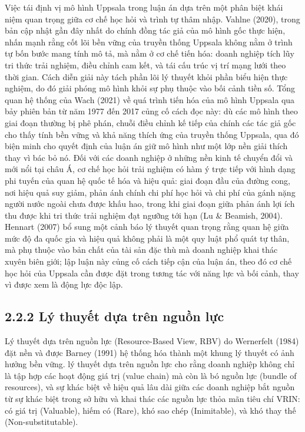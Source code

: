 \documentclass[
  a4paper,
  13pt]{extreport}
\begin{document}
Việc tái định vị mô hình Uppsala trong luận án dựa trên một phân biệt
khái niệm quan trọng giữa cơ chế học hỏi và trình tự thâm nhập. Vahlne
(2020), trong bản cập nhật gần đây nhất do chính đồng tác giả của mô
hình gốc thực hiện, nhấn mạnh rằng cốt lõi bền vững của truyền thống
Uppsala không nằm ở trình tự bốn bước mang tính mô tả, mà nằm ở cơ chế
tiến hóa: doanh nghiệp tích lũy tri thức trải nghiệm, điều chỉnh cam
kết, và tái cấu trúc vị trí mạng lưới theo thời gian. Cách diễn giải này
tách phần lõi lý thuyết khỏi phần biểu hiện thực nghiệm, do đó giải
phóng mô hình khỏi sự phụ thuộc vào bối cảnh tiền số. Tổng quan hệ thống
của Wach (2021) về quá trình tiến hóa của mô hình Uppsala qua bảy phiên
bản từ năm 1977 đến 2017 củng cố cách đọc này: dù các mô hình theo giai
đoạn thường bị phê phán, chuỗi điều chỉnh kế tiếp của chính các tác giả
gốc cho thấy tính bền vững và khả năng thích ứng của truyền thống
Uppsala, qua đó biện minh cho quyết định của luận án giữ mô hình như một
lớp nền giải thích thay vì bác bỏ nó. Đối với các doanh nghiệp ở những
nền kinh tế chuyển đổi và mới nổi tại châu Á, cơ chế học hỏi trải nghiệm
có hàm ý trực tiếp với hình dạng phi tuyến của quan hệ quốc tế hóa và
hiệu quả: giai đoạn đầu của đường cong, nơi hiệu quả suy giảm, phản ánh
chính chi phí học hỏi và chi phí của gánh nặng người nước ngoài chưa
được khấu hao, trong khi giai đoạn giữa phản ánh lợi ích thu được khi
tri thức trải nghiệm đạt ngưỡng tới hạn (Lu \& Beamish, 2004). Hennart
(2007) bổ sung một cảnh báo lý thuyết quan trọng rằng quan hệ giữa mức
độ đa quốc gia và hiệu quả không phải là một quy luật phổ quát tự thân,
mà phụ thuộc vào bản chất của tài sản đặc thù mà doanh nghiệp khai thác
xuyên biên giới; lập luận này củng cố cách tiếp cận của luận án, theo đó
cơ chế học hỏi của Uppsala cần được đặt trong tương tác với năng lực và
bối cảnh, thay vì được xem là động lực độc lập.

\hypertarget{luxfd-thuyux1ebft-dux1ef1a-truxean-nguux1ed3n-lux1ef1c}{%
\subsection{2.2.2 Lý thuyết dựa trên nguồn
lực}\label{luxfd-thuyux1ebft-dux1ef1a-truxean-nguux1ed3n-lux1ef1c}}

Lý thuyết dựa trên nguồn lực (Resource-Based View, RBV) do Wernerfelt
(1984) đặt nền và được Barney (1991) hệ thống hóa thành một khung lý
thuyết có ảnh hưởng bền vững. lý thuyết dựa trên nguồn lực cho rằng
doanh nghiệp không chỉ là tập hợp các hoạt động giá trị (value chain) mà
còn là bó nguồn lực (bundle of resources), và sự khác biệt về hiệu quả
lâu dài giữa các doanh nghiệp bắt nguồn từ sự khác biệt trong sở hữu và
khai thác các nguồn lực thỏa mãn tiêu chí VRIN: có giá trị (Valuable),
hiếm có (Rare), khó sao chép (Inimitable), và khó thay thế
(Non-substitutable).
\end{document}
